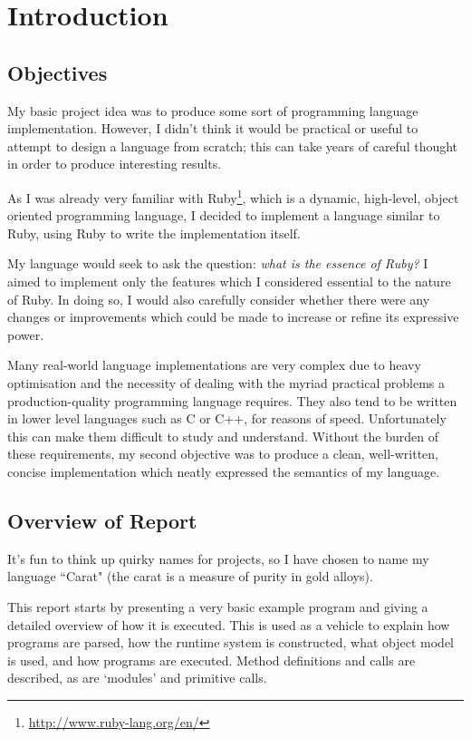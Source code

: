 \chapter{Introduction}

\section{Objectives}

My basic project idea was to produce some sort of programming language implementation. However, I didn't think it would be practical or useful to attempt to design a language from scratch; this can take years of careful thought in order to produce interesting results.

As I was already very familiar with Ruby\footnote{\url{http://www.ruby-lang.org/en/}}, which is a dynamic, high-level, object oriented programming language, I decided to implement a language similar to Ruby, using Ruby to write the implementation itself.

My language would seek to ask the question: \textit{what is the essence of Ruby?} I aimed to implement only the features which I considered essential to the nature of Ruby. In doing so, I would also carefully consider whether there were any changes or improvements which could be made to increase or refine its expressive power.

Many real-world language implementations are very complex due to heavy optimisation and the necessity of dealing with the myriad practical problems a production-quality programming language requires. They also tend to be written in lower level languages such as C or C++, for reasons of speed. Unfortunately this can make them difficult to study and understand. Without the burden of these requirements, my second objective was to produce a clean, well-written, concise implementation which neatly expressed the semantics of my language.

\section{Overview of Report}

It's fun to think up quirky names for projects, so I have chosen to name my language ``Carat" (the carat is a measure of purity in gold alloys).

This report starts by presenting a very basic example program and giving a detailed overview of how it is executed. This is used as a vehicle to explain how programs are parsed, how the runtime system is constructed, what object model is used, and how programs are executed. Method definitions and calls are described, as are `modules' and primitive calls.

